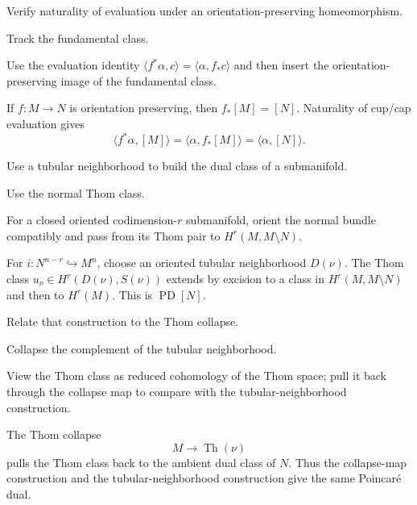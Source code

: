 \begin{exercise}\label{exr:viii33-12}
Verify naturality of evaluation under an orientation-preserving homeomorphism.
\end{exercise}
\begin{hint}
Track the fundamental class.

Use the evaluation identity \(\langle f^*\alpha,c\rangle=\langle\alpha,f_*c\rangle\) and then insert the orientation-preserving image of the fundamental class.
\end{hint}
\begin{solution}
If \(f:M\to N\) is orientation preserving, then \(f_*[M]=[N]\). Naturality of cup/cap evaluation gives
\[
\langle f^*\alpha,[M]\rangle=\langle\alpha,f_*[M]\rangle=\langle\alpha,[N]\rangle.
\]
\end{solution}

\begin{exercise}\label{exr:viii33-13}
Use a tubular neighborhood to build the dual class of a submanifold.
\end{exercise}
\begin{hint}
Use the normal Thom class.

For a closed oriented codimension-\(r\) submanifold, orient the normal bundle compatibly and pass from its Thom pair to \(H^r(M,M\setminus N)\).
\end{hint}
\begin{solution}
For \(i:N^{n-r}\hookrightarrow M^n\), choose an oriented tubular neighborhood \(D(\nu)\). The Thom class \(u_\nu\in H^r(D(\nu),S(\nu))\) extends by excision to a class in \(H^r(M,M\setminus N)\) and then to \(H^r(M)\). This is \(\operatorname{PD}[N]\).
\end{solution}

\begin{exercise}\label{exr:viii33-14}
Relate that construction to the Thom collapse.
\end{exercise}
\begin{hint}
Collapse the complement of the tubular neighborhood.

View the Thom class as reduced cohomology of the Thom space; pull it back through the collapse map to compare with the tubular-neighborhood construction.
\end{hint}
\begin{solution}
The Thom collapse
\[
M\to\operatorname{Th}(\nu)
\]
pulls the Thom class back to the ambient dual class of \(N\). Thus the collapse-map construction and the tubular-neighborhood construction give the same Poincaré dual.
\end{solution}

